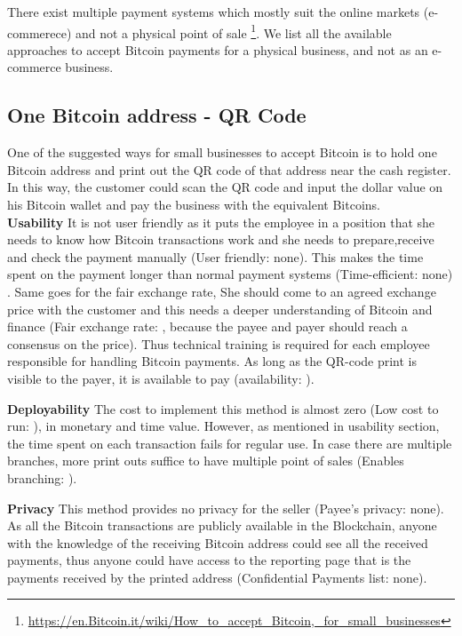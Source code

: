 There exist multiple payment systems which mostly suit the online markets (\eg e-commerece) and not a physical point of sale \footnote{\url{https://en.Bitcoin.it/wiki/How_to_accept_Bitcoin,_for_small_businesses}}. We list all the available approaches to accept Bitcoin payments for a physical business, and not as an e-commerce business.

\subsection{One Bitcoin address - QR Code} 
One of the suggested ways for small businesses to accept Bitcoin is to hold one Bitcoin address and print out the QR code of that address near the cash register. In this way, the customer could scan the QR code and input the dollar value on his Bitcoin wallet and pay the business with the equivalent Bitcoins. \\

\textbf{Usability} It is not user friendly as it puts the employee in a position that she needs to know how Bitcoin transactions work and she needs to prepare,receive and check  the payment manually (User friendly: none). This makes the time spent on the payment longer than normal payment systems (Time-efficient: none) . Same goes for the fair exchange rate, She should come to an agreed exchange price with the customer and this needs a deeper understanding of Bitcoin and finance (Fair exchange rate: \prt, because the payee and payer should reach a consensus on the price). Thus technical training is required for each employee responsible for handling Bitcoin payments. As long as the QR-code print is visible to the payer, it is available to pay (availability: \full).

\textbf{Deployability} The cost to implement this method is almost zero (Low cost to run: \full), in monetary and time value. However, as mentioned in usability section, the time spent on each transaction fails for regular use. In case there are multiple branches, more print outs suffice to have multiple point of sales (Enables branching: \prt).

\textbf{Privacy} This method provides no privacy for the seller (Payee's privacy: none). As all the Bitcoin transactions are publicly available in the Blockchain, anyone with the knowledge of the receiving Bitcoin address could see all the received payments, thus anyone could have access to the reporting page that is the payments received by the printed address (Confidential Payments list: none).


